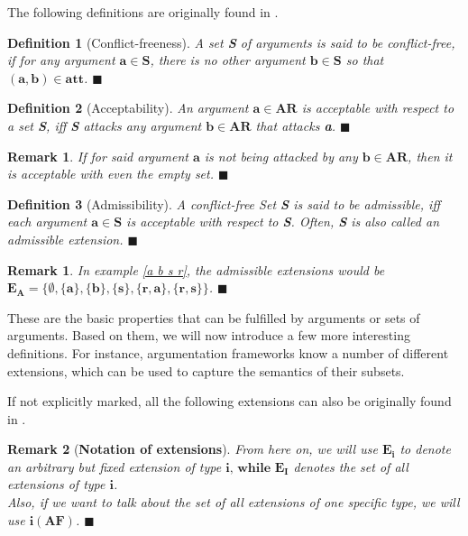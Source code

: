 \documentclass[12pt]{report}
\numberwithin{figure}{chapter}
\theoremstyle{break}
\newtheorem{defn}{Definition}[chapter]
\newtheorem*{rmrk}{Remark}
\newtheorem*{frmrk}{Remark}
\newenvironment{mydefn}{\begin{defn}}{$\blacksquare$ \end{defn}}
\newenvironment{myrmrk}{\begin{rmrk}}{$\blacksquare$ \end{rmrk}}
\newenvironment{myfrmrk}{\begin{frmrk}}{$\blacksquare$ \end{frmrk}}
\begin{document}
The following definitions are originally found in \cite{Dung}.

\begin{mydefn}[Conflict-freeness]
A set \textbf{S} of arguments is said to be conflict-free, if for any argument $\bm{a \in S}$, there is no other argument $\bm{b \in S}$ so that $\bm{(a,b) \in att}$.
\end{mydefn}

\begin{mydefn}[Acceptability]
An argument $\bm{a \in AR}$ is acceptable with respect to a set \textbf{S}, iff \textbf{S} attacks any argument $\bm{b \in AR}$ that attacks \textbf{a}. 
\end{mydefn}

\begin{myfrmrk}
If for said argument $\bm{a}$ is not being attacked by any $\bm{b \in AR}$, then it is acceptable with even the empty set.
\end{myfrmrk}

\begin{mydefn}[Admissibility]
A conflict-free Set \textbf{S} is said to be admissible, iff each argument $\bm{a \in S}$ is acceptable with respect to \textbf{S}.
Often, \textbf{S} is also called an admissible extension.
\label{admissible}
\end{mydefn}
\begin{myrmrk}
In example \ref{a b s r}, the admissible extensions would be $\bm{E_A = \{\emptyset,\{a\},\{b\},\{s\},\{r,a\},\{r,s\}\}}$. 
\end{myrmrk}

These are the basic properties that can be fulfilled by arguments or sets of arguments. Based on them, we will now introduce a few more interesting definitions.
For instance, argumentation frameworks know a number of different extensions, which can be used to capture the semantics of their subsets. 

\newpage
If not explicitly marked, all the following extensions can also be originally found in \cite{Dung}.

\begin{myrmrk}[\textbf{Notation of extensions}]
From here on, we will use $\bm{E_{i}}$ to denote an arbitrary but fixed extension of type $\bm{i \text{, while } E_{I}}$ denotes the set of all extensions of type $\bm{i}$.\\
Also, if we want to talk about the set of all extensions of one specific type, we will use $\bm{i(AF)}$.
\end{myrmrk}
\end{document}
